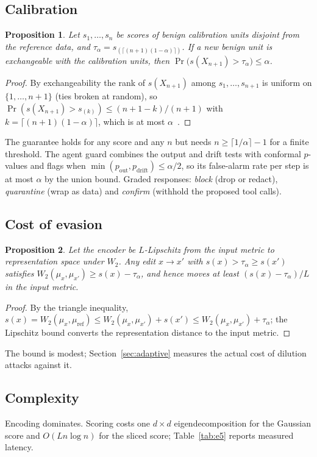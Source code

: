 \documentclass[review,12pt]{elsarticle}
\newtheorem{proposition}{Proposition}
\begin{document}
\subsection{Calibration}
\begin{proposition}\label{prop:conformal}
Let $s_1,\dots,s_n$ be scores of benign calibration units disjoint from the reference data, and
$\tau_\alpha=s_{(\lceil(n+1)(1-\alpha)\rceil)}$. If a new benign unit is exchangeable with the calibration
units, then $\Pr\big(s(X_{n+1})>\tau_\alpha\big)\le\alpha$.
\end{proposition}
\begin{proof}
By exchangeability the rank of $s(X_{n+1})$ among $s_1,\dots,s_{n+1}$ is uniform on $\{1,\dots,n+1\}$ (ties
broken at random), so $\Pr(s(X_{n+1})>s_{(k)})\le (n+1-k)/(n+1)$ with $k=\lceil(n+1)(1-\alpha)\rceil$, which is at
most $\alpha$~\cite{angelopoulos2023conformal}.
\end{proof}
The guarantee holds for any score and any $n$ but needs $n\ge\lceil 1/\alpha\rceil-1$ for a finite threshold.
The agent guard combines the output and drift tests with conformal $p$-values and flags when
$\min(p_{\mathrm{out}},p_{\mathrm{drift}})\le\alpha/2$, so its false-alarm rate per step is at most $\alpha$ by
the union bound. Graded responses: \emph{block} (drop or redact), \emph{quarantine} (wrap as data) and
\emph{confirm} (withhold the proposed tool calls).

\subsection{Cost of evasion}
\begin{proposition}\label{prop:evasion}
Let the encoder be $L$-Lipschitz from the input metric to representation space under $W_2$. Any edit
$x\to x'$ with $s(x)>\tau_\alpha\ge s(x')$ satisfies $W_2(\mu_x,\mu_{x'})\ge s(x)-\tau_\alpha$, and hence moves
at least $(s(x)-\tau_\alpha)/L$ in the input metric.
\end{proposition}
\begin{proof}
By the triangle inequality, $s(x)=W_2(\mu_x,\mu_{\mathrm{ref}})\le W_2(\mu_x,\mu_{x'})+s(x')\le
W_2(\mu_x,\mu_{x'})+\tau_\alpha$; the Lipschitz bound converts the representation distance to the input metric.
\end{proof}
The bound is modest; Section~\ref{sec:adaptive} measures the actual cost of dilution attacks against it.

\subsection{Complexity}
Encoding dominates. Scoring costs one $d\times d$ eigendecomposition for the Gaussian score and
$O(Ln\log n)$ for the sliced score; Table~\ref{tab:e5} reports measured latency.
\end{document}
